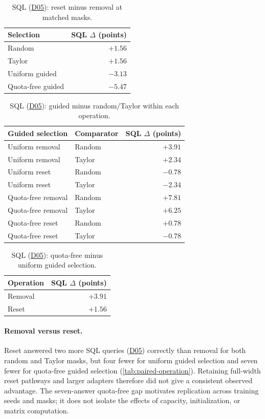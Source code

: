 \documentclass[10pt,letterpaper]{article}
\DeclareRobustCommand{\dataset}[1]{\hyperlink{dataset-#1}{\textnormal{#1}}}
\begin{document}
\begin{table}[htbp]
\centering
\small
\caption{SQL (\dataset{D05}): reset minus removal at matched masks.}
\label{tab:paired-operation}
\begin{tabular}{@{}lr@{}}
\toprule
Selection & SQL $\Delta$ (points)\\
\midrule
Random & $+1.56$\\
Taylor & $+1.56$\\
Uniform guided & $-3.13$\\
Quota-free guided & $-5.47$\\
\bottomrule
\end{tabular}
\end{table}

\begin{table}[htbp]
\centering
\small
\caption{SQL (\dataset{D05}): guided minus random/Taylor within each operation.}
\label{tab:paired-selection}
\begin{tabular}{@{}llr@{}}
\toprule
Guided selection & Comparator & SQL $\Delta$ (points)\\
\midrule
Uniform removal & Random & $+3.91$\\
Uniform removal & Taylor & $+2.34$\\
Uniform reset & Random & $-0.78$\\
Uniform reset & Taylor & $-2.34$\\
Quota-free removal & Random & $+7.81$\\
Quota-free removal & Taylor & $+6.25$\\
Quota-free reset & Random & $+0.78$\\
Quota-free reset & Taylor & $-0.78$\\
\bottomrule
\end{tabular}
\end{table}

\begin{table}[htbp]
\centering
\small
\caption{SQL (\dataset{D05}): quota-free minus uniform guided selection.}
\label{tab:paired-allocation}
\begin{tabular}{@{}lr@{}}
\toprule
Operation & SQL $\Delta$ (points)\\
\midrule
Removal & $+3.91$\\
Reset & $+1.56$\\
\bottomrule
\end{tabular}
\end{table}

\paragraph{Removal versus reset.}
Reset answered two more SQL queries (\dataset{D05}) correctly than removal for both random
and Taylor masks, but four fewer for uniform guided selection and seven
fewer for quota-free guided selection (\autoref{tab:paired-operation}).
Retaining full-width reset pathways and larger adapters therefore did not
give a consistent observed advantage. The seven-answer quota-free gap
motivates replication across training seeds and masks; it does not isolate
the effects of capacity, initialization, or matrix computation.
\end{document}
